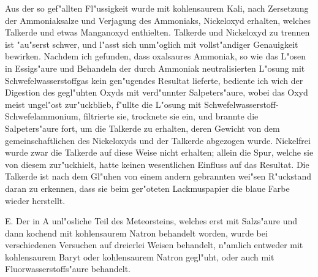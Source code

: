 \documentclass[a4paper, 11pt, oneside]{article}
\begin{document}
Aus der so gef"allten Fl"ussigkeit wurde mit kohlensaurem Kali, nach Zersetzung der Ammoniaksalze und Verjagung des Ammoniaks, Nickeloxyd erhalten, welches Talkerde und etwas Manganoxyd enthielten. Talkerde und Nickeloxyd zu trennen ist "au"serst schwer, und l"asst sich unm"oglich mit vollst"andiger Genauigkeit bewirken. Nachdem ich gefunden, dass oxalsaures Ammoniak, so wie das L"osen in Essigs"aure und Behandeln der durch Ammoniak neutralisierten L"osung mit Schwefelwasserstoffgas kein gen"ugendes Resultat lieferte, bediente ich wich der Digestion des gegl"uhten Oxyds mit verd"unnter Salpeters"aure, wobei das Oxyd meist ungel"ost zur"uckblieb, f"ullte die L"osung mit Schwefelwasserstoff-Schwefelammonium, filtrierte sie, trocknete sie ein, und brannte die Salpeters"aure fort, um die Talkerde zu erhalten, deren Gewicht von dem gemeinschaftlichen des Nickeloxyds und der Talkerde abgezogen wurde. Nickelfrei wurde zwar die Talkerde auf diese Weise nicht erhalten; allein die Spur, welche sie von diesem zur"uckhielt, hatte keinen wesentlichen Einfluss auf das Resultat. Die Talkerde ist nach dem Gl"uhen von einem andern gebrannten wei"sen R"uckstand daran zu erkennen, dass sie beim ger"oteten Lackmuspapier die blaue Farbe wieder herstellt.

E. Der in A unl"osliche Teil des Meteorsteins, welches erst mit Salzs"aure und dann kochend mit kohlensaurem Natron behandelt worden, wurde bei verschiedenen Versuchen auf dreierlei Weisen behandelt, n"amlich entweder mit kohlensaurem Baryt oder kohlensaurem Natron gegl"uht, oder auch mit Fluorwasserstoffs"aure behandelt.
\end{document}
